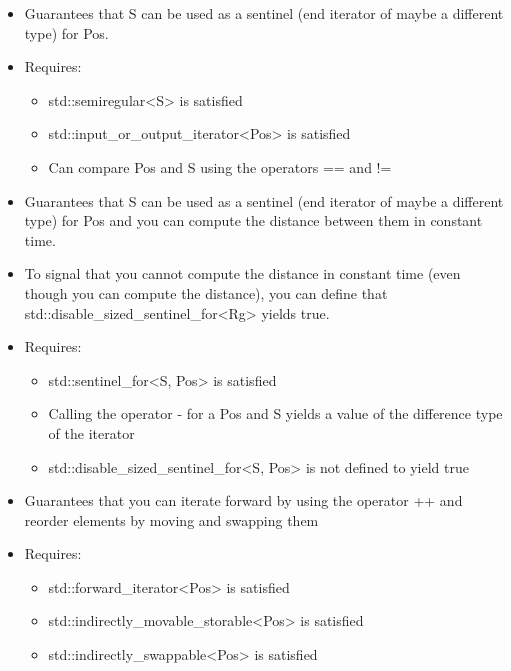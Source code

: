 
\begin{itemize}
\item
Guarantees that S can be used as a sentinel (end iterator of maybe a different type) for Pos.

\item
Requires:
\begin{itemize}
\item
std::semiregular<S> is satisfied

\item
std::input\_or\_output\_iterator<Pos> is satisfied

\item
Can compare Pos and S using the operators == and !=
\end{itemize}
\end{itemize}


\begin{itemize}
\item
Guarantees that S can be used as a sentinel (end iterator of maybe a different type) for Pos and you can compute the distance between them in constant time.

\item
To signal that you cannot compute the distance in constant time (even though you can compute the distance), you can define that std::disable\_sized\_sentinel\_for<Rg> yields true.

\item
Requires:
\begin{itemize}
\item
std::sentinel\_for<S, Pos> is satisfied

\item
Calling the operator - for a Pos and S yields a value of the difference type of the iterator

\item
std::disable\_sized\_sentinel\_for<S, Pos> is not defined to yield true
\end{itemize}
\end{itemize}



\begin{itemize}
\item
Guarantees that you can iterate forward by using the operator ++ and reorder elements by moving and swapping them

\item
Requires:
\begin{itemize}
\item
std::forward\_iterator<Pos> is satisfied

\item
std::indirectly\_movable\_storable<Pos> is satisfied

\item
std::indirectly\_swappable<Pos> is satisfied
\end{itemize}
\end{itemize}


